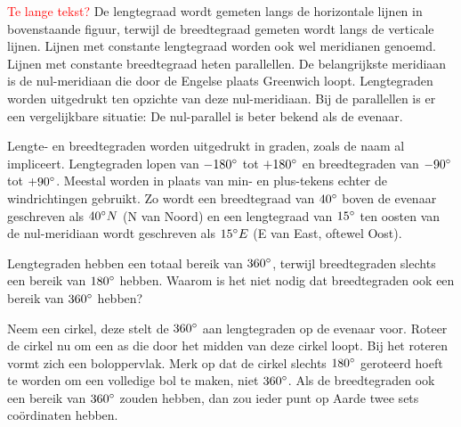 \textcolor{red}{Te lange tekst?}
De lengtegraad wordt gemeten langs de horizontale lijnen in bovenstaande figuur, terwijl de breedtegraad gemeten wordt langs de verticale lijnen. Lijnen met constante lengtegraad worden ook wel meridianen genoemd. Lijnen met constante breedtegraad heten parallellen. De belangrijkste meridiaan is de nul-meridiaan die door de Engelse plaats Greenwich loopt. Lengtegraden worden uitgedrukt ten opzichte van deze nul-meridiaan. Bij de parallellen is er een vergelijkbare situatie: De nul-parallel is beter bekend als de evenaar.

Lengte- en breedtegraden worden uitgedrukt in graden, zoals de naam al impliceert. Lengtegraden lopen van $-180\degree$ tot $+180\degree$ en breedtegraden van $-90\degree$ tot $+90\degree$. Meestal worden in plaats van min- en plus-tekens echter de windrichtingen gebruikt. Zo wordt een breedtegraad van $40\degree$ boven de evenaar geschreven als $40\degree N$ (N van Noord) en een lengtegraad van $15\degree$ ten oosten van de nul-meridiaan wordt geschreven als $15\degree E$ (E van East, oftewel Oost).

\begin{opgave}
	Lengtegraden hebben een totaal bereik van $360\degree$, terwijl breedtegraden slechts een bereik van $180\degree$ hebben. Waarom is het niet nodig dat breedtegraden ook een bereik van $360\degree$ hebben?
	\begin{antwoord}
		Neem een cirkel, deze stelt de $360\degree$ aan lengtegraden op de evenaar voor. Roteer de cirkel nu om een as die door het midden van deze cirkel loopt. Bij het roteren vormt zich een boloppervlak. Merk op dat de cirkel slechts $180\degree$ geroteerd hoeft te worden om een volledige bol te maken, niet $360\degree$. Als de breedtegraden ook een bereik van $360\degree$ zouden hebben, dan zou ieder punt op Aarde twee sets co\"ordinaten hebben.
	\end{antwoord}
\end{opgave}

